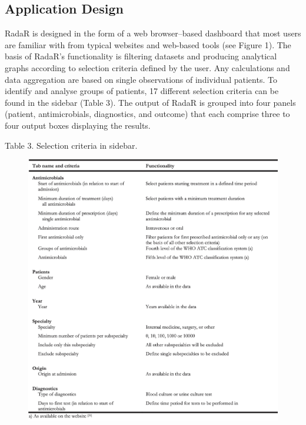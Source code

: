\documentclass[
]{book}
\begin{document}
\hypertarget{application-design}{%
\subsection{Application Design}\label{application-design}}

RadaR is designed in the form of a web browser--based dashboard that most users are familiar with from typical websites and web-based tools (see Figure 1). The basis of RadaR's functionality is filtering datasets and producing analytical graphs according to selection criteria defined by the user. Any calculations and data aggregation are based on single observations of individual patients. To identify and analyse groups of patients, 17 different selection criteria can be found in the sidebar (Table 3). The output of RadaR is grouped into four panels (patient, antimicrobials, diagnostics, and outcome) that each comprise three to four output boxes displaying the results.

Table 3. Selection criteria in sidebar.

\begin{figure}

{\centering \includegraphics[width=1\linewidth]{images/05-t03} 

}

\end{figure}
\end{document}
